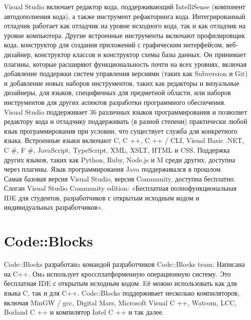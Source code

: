 Visual Studio включает редактор кода, поддерживающий IntelliSense (компонент автодополнения кода), а 
также инструмент рефакторинга кода. Интегрированный отладчик работает как отладчик на уровне 
исходного кода, так и как отладчик на уровне компьютера. Другие встроенные инструменты включают
профилировщик кода, конструктор для создания приложений с графическим интерфейсом, веб-дизайнер,
конструктор классов и конструктор схемы базы данных. Он принимает плагины, которые расширяют
функциональность почти на всех уровнях, включая добавление поддержки систем управления версиями 
(таких как Subversion и Git) и добавление новых наборов инструментов, таких как редакторы и 
визуальные дизайнеры, для языков, специфичных для предметной области, или наборов инструментов для 
других аспектов разработки программного обеспечения.\\

Visual Studio поддерживает 36 различных языков программирования и позволяет редактору кода и 
отладчику поддерживать (в разной степени) практически любой язык программирования при условии, 
что существует служба для конкретного языка. Встроенные языки включают C, C ++, C ++ / CLI, Visual 
Basic .NET, C #, F #, JavaScript, TypeScript, XML, XSLT, HTML и CSS. Поддержка других языков, 
таких как Python, Ruby, Node.js и M среди других, доступна через плагины. Язык программирования Java 
поддерживался в прошлом.\\

Самая базовая версия Visual Studio, версия Community, доступна бесплатно. Слоган Visual Studio 
Community edition: «Бесплатная полнофункциональная IDE для студентов, разработчиков с открытым 
исходным кодом и индивидуальных разработчиков».\\

\section{Code::Blocks}
Code::Blocks разработанa командой разработчиков Code::Blocks team. Написана на C++. Онa использует
кроссплатформенную операционную систему. Это бесплатная IDE с открытым исходным кодом. Eё можно
использовать как для языка C, так и для C++. Code::Blocks поддерживает несколько компиляторов, 
включая MinGW / gcc, Digital Mars, Microsoft Visual C ++, Watcom, LCC, Borland C ++ и компилятор 
Intel C ++ и так далее.\\ 


